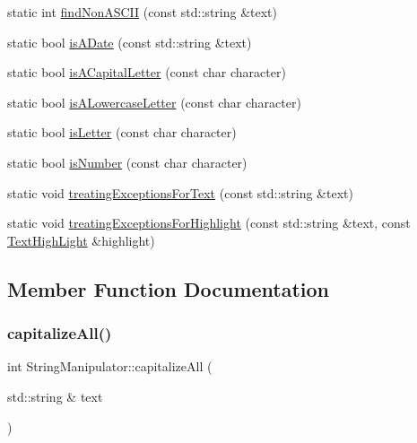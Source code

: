\begin{DoxyCompactItemize}
\item 
static int \hyperlink{class_string_manipulator_a796e69a9713a9bda08b205100d060016}{find\+Non\+A\+S\+C\+II} (const std\+::string \&text)
\item 
static bool \hyperlink{class_string_manipulator_a65e4f86e702032166fa31019e2562984}{is\+A\+Date} (const std\+::string \&text)
\item 
static bool \hyperlink{class_string_manipulator_a4889fe079d632384918058b0e6dfb53f}{is\+A\+Capital\+Letter} (const char character)
\item 
static bool \hyperlink{class_string_manipulator_a7cae6c9bcfd1d924f20ebbcf3b61f52a}{is\+A\+Lowercase\+Letter} (const char character)
\item 
static bool \hyperlink{class_string_manipulator_a73afb49f8c116036fe2aa8d2e6ac81c1}{is\+Letter} (const char character)
\item 
static bool \hyperlink{class_string_manipulator_aa59cf4c8d9832ba6cb60e7d1636ea860}{is\+Number} (const char character)
\item 
static void \hyperlink{class_string_manipulator_a89012eafe7e806cc95f5400cc46c3dd8}{treating\+Exceptions\+For\+Text} (const std\+::string \&text)
\item 
static void \hyperlink{class_string_manipulator_a2fcadd35bf6e7343aceca8982ca3efc6}{treating\+Exceptions\+For\+Highlight} (const std\+::string \&text, const \hyperlink{class_text_high_light}{Text\+High\+Light} \&highlight)
\end{DoxyCompactItemize}


\subsection{Member Function Documentation}
\mbox{\label{class_string_manipulator_a5c3623c8798af0aa7230f972e8be6032}} 
\subsubsection{\texorpdfstring{capitalize\+All()}{capitalizeAll()}}
{\footnotesize\ttfamily int String\+Manipulator\+::capitalize\+All (\begin{DoxyParamCaption}\item[{std\+::string \&}]{text }\end{DoxyParamCaption})\hspace{0.3cm}{\ttfamily [static]}}

